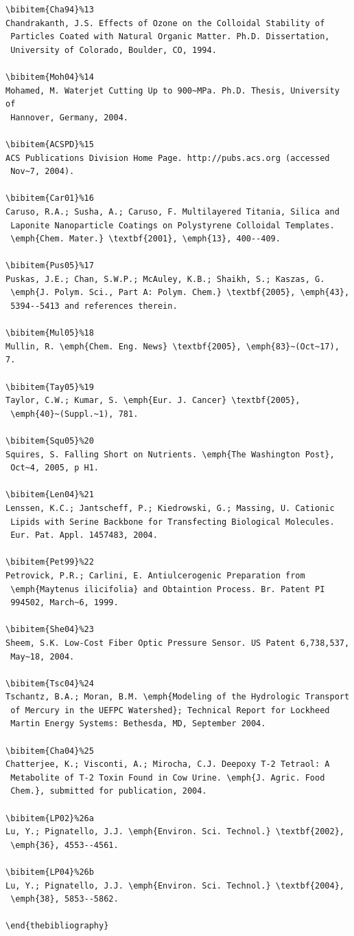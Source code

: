 \documentclass[]{interact}
\theoremstyle{plain}%
\theoremstyle{definition}
\theoremstyle{remark}
\begin{document}
\begin{verbatim}
\bibitem{Cha94}%13
Chandrakanth, J.S. Effects of Ozone on the Colloidal Stability of 
 Particles Coated with Natural Organic Matter. Ph.D. Dissertation, 
 University of Colorado, Boulder, CO, 1994.

\bibitem{Moh04}%14
Mohamed, M. Waterjet Cutting Up to 900~MPa. Ph.D. Thesis, University of
 Hannover, Germany, 2004.

\bibitem{ACSPD}%15
ACS Publications Division Home Page. http://pubs.acs.org (accessed 
 Nov~7, 2004).

\bibitem{Car01}%16
Caruso, R.A.; Susha, A.; Caruso, F. Multilayered Titania, Silica and 
 Laponite Nanoparticle Coatings on Polystyrene Colloidal Templates. 
 \emph{Chem. Mater.} \textbf{2001}, \emph{13}, 400--409.

\bibitem{Pus05}%17
Puskas, J.E.; Chan, S.W.P.; McAuley, K.B.; Shaikh, S.; Kaszas, G. 
 \emph{J. Polym. Sci., Part A: Polym. Chem.} \textbf{2005}, \emph{43}, 
 5394--5413 and references therein.

\bibitem{Mul05}%18
Mullin, R. \emph{Chem. Eng. News} \textbf{2005}, \emph{83}~(Oct~17), 7.

\bibitem{Tay05}%19
Taylor, C.W.; Kumar, S. \emph{Eur. J. Cancer} \textbf{2005},
 \emph{40}~(Suppl.~1), 781.

\bibitem{Squ05}%20
Squires, S. Falling Short on Nutrients. \emph{The Washington Post}, 
 Oct~4, 2005, p H1.

\bibitem{Len04}%21
Lenssen, K.C.; Jantscheff, P.; Kiedrowski, G.; Massing, U. Cationic 
 Lipids with Serine Backbone for Transfecting Biological Molecules. 
 Eur. Pat. Appl. 1457483, 2004.

\bibitem{Pet99}%22
Petrovick, P.R.; Carlini, E. Antiulcerogenic Preparation from 
 \emph{Maytenus ilicifolia} and Obtaintion Process. Br. Patent PI 
 994502, March~6, 1999.

\bibitem{She04}%23
Sheem, S.K. Low-Cost Fiber Optic Pressure Sensor. US Patent 6,738,537,
 May~18, 2004.

\bibitem{Tsc04}%24
Tschantz, B.A.; Moran, B.M. \emph{Modeling of the Hydrologic Transport 
 of Mercury in the UEFPC Watershed}; Technical Report for Lockheed 
 Martin Energy Systems: Bethesda, MD, September 2004.

\bibitem{Cha04}%25
Chatterjee, K.; Visconti, A.; Mirocha, C.J. Deepoxy T-2 Tetraol: A 
 Metabolite of T-2 Toxin Found in Cow Urine. \emph{J. Agric. Food 
 Chem.}, submitted for publication, 2004.

\bibitem{LP02}%26a
Lu, Y.; Pignatello, J.J. \emph{Environ. Sci. Technol.} \textbf{2002},
 \emph{36}, 4553--4561.

\bibitem{LP04}%26b
Lu, Y.; Pignatello, J.J. \emph{Environ. Sci. Technol.} \textbf{2004},
 \emph{38}, 5853--5862.

\end{thebibliography}
\end{verbatim}
\end{document}
